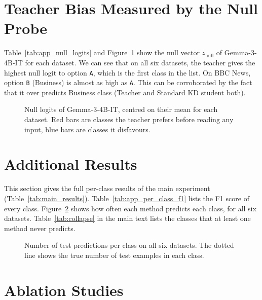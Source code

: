\documentclass[11pt]{article}
\begin{document}
\FloatBarrier
\section{Teacher Bias Measured by the Null Probe}
\label{app:null_logits}

Table~\ref{tab:app_null_logits} and Figure~\ref{fig:app_null_logits} show the null vector $z_{\text{null}}$ of Gemma-3-4B-IT for each dataset.
We can see that on all six datasets, the teacher gives the highest null logit to option \texttt{A}, which is the first class in the list.
On BBC News, option \texttt{B} (Business) is almost as high as \texttt{A}. This can be corroborated by the fact that it over predicts Business class (Teacher and Standard KD student both).



\begin{figure}[!ht]
\centering
{}
\caption{Null logits of Gemma-3-4B-IT, centred on their mean for each dataset. Red bars are classes the teacher prefers before reading any input, blue bars are classes it disfavours.}
\label{fig:app_null_logits}
\end{figure}

\FloatBarrier
\section{Additional Results}
\label{app:additional}

This section gives the full per-class results of the main experiment (Table~\ref{tab:main_results}).
Table~\ref{tab:app_per_class_f1} lists the F1 score of every class.
Figure~\ref{fig:app_class_dist_all} shows how often each method predicts each class, for all six datasets.
Table~\ref{tab:collapse} in the main text lists the classes that at least one method never predicts.



\begin{figure}[!ht]
\centering
{}
\caption{Number of test predictions per class on all six datasets. The dotted line shows the true number of test examples in each class.}
\label{fig:app_class_dist_all}
\end{figure}

\FloatBarrier
\section{Ablation Studies}
\label{app:ablations}
\end{document}
